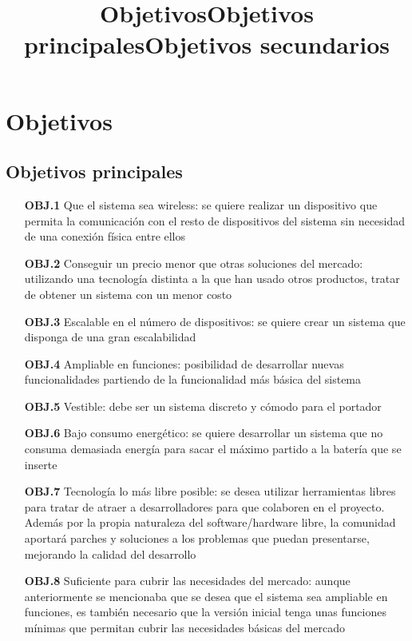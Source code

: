 \chapter{Objetivos}
\title{Objetivos}

\title{Objetivos principales}
\section{
Objetivos principales
}
  \begin{itemize}
    \item[\textbf{OBJ.1}] Que el sistema sea wireless: se quiere realizar un dispositivo que permita la comunicación con el resto de dispositivos del sistema sin necesidad de una conexión física entre ellos
    \item[\textbf{OBJ.2}] Conseguir un precio menor que otras soluciones del mercado: utilizando una tecnología distinta a la que han usado otros productos, tratar de obtener un sistema con un menor costo
    \item[\textbf{OBJ.3}] Escalable en el número de dispositivos: se quiere crear un sistema que disponga de una gran escalabilidad
    \item[\textbf{OBJ.4}] Ampliable en funciones: posibilidad de desarrollar nuevas funcionalidades partiendo de la funcionalidad más básica del sistema
    \item[\textbf{OBJ.5}] Vestible: debe ser un sistema discreto y cómodo para el portador
    \item[\textbf{OBJ.6}] Bajo consumo energético: se quiere desarrollar un sistema que no consuma demasiada energía para sacar el máximo partido a la batería que se inserte
    \item[\textbf{OBJ.7}] Tecnología lo más libre posible: se desea utilizar herramientas libres para tratar de atraer a desarrolladores para que colaboren en el proyecto. Además por la propia naturaleza del software/hardware libre, la comunidad aportará parches y soluciones a los problemas que puedan presentarse, mejorando la calidad del desarrollo
    \item[\textbf{OBJ.8}] Suficiente para cubrir las necesidades del mercado: aunque anteriormente se mencionaba que se desea que el sistema sea ampliable en funciones, es también necesario que la versión inicial tenga unas funciones mínimas que permitan cubrir las necesidades básicas del mercado
  \end{itemize}

\title{Objetivos secundarios}
